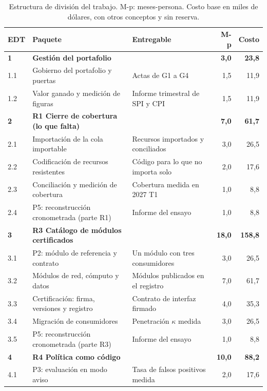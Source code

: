 \documentclass[11pt,letterpaper]{article}
\begin{document}
\begin{table}[H]
\centering
\footnotesize
\setlength{\tabcolsep}{3.5pt}
\caption{Estructura de división del trabajo. M-p: meses-persona. Costo base en
miles de dólares, con otros conceptos y sin reserva.}
\label{tab:edt}
\begin{tabularx}{\textwidth}{@{}l>{\raggedright\arraybackslash}p{5.4cm}>{\raggedright\arraybackslash}Xrr@{}}
\toprule
\textbf{EDT} & \textbf{Paquete} & \textbf{Entregable} & \textbf{M-p} &
  \textbf{Costo} \\
\midrule
\textbf{1} & \textbf{Gestión del portafolio} & & \textbf{3,0} & \textbf{23,8} \\
1.1 & Gobierno del portafolio y puertas & Actas de G1 a G4 & 1,5 & 11,9 \\
1.2 & Valor ganado y medición de figuras & Informe trimestral de SPI y CPI & 1,5 & 11,9 \\
\addlinespace[2pt]
\textbf{2} & \textbf{R1 Cierre de cobertura (lo que falta)} & & \textbf{7,0} & \textbf{61,7} \\
2.1 & Importación de la cola importable & Recursos importados y conciliados & 3,0 & 26,5 \\
2.2 & Codificación de recursos resistentes & Código para lo que no importa solo & 2,0 & 17,6 \\
2.3 & Conciliación y medición de cobertura & Cobertura medida en 2027 T1 & 1,0 & 8,8 \\
2.4 & P5: reconstrucción cronometrada (parte R1) & Informe del ensayo & 1,0 & 8,8 \\
\addlinespace[2pt]
\textbf{3} & \textbf{R3 Catálogo de módulos certificados} & & \textbf{18,0} & \textbf{158,8} \\
3.1 & P2: módulo de referencia y contrato & Un módulo con tres consumidores & 3,0 & 26,5 \\
3.2 & Módulos de red, cómputo y datos & Módulos publicados en el registro & 7,0 & 61,7 \\
3.3 & Certificación: firma, versiones y registro & Contrato de interfaz firmado & 4,0 & 35,3 \\
3.4 & Migración de consumidores & Penetración $\kappa$ medida & 3,0 & 26,5 \\
3.5 & P5: reconstrucción cronometrada (parte R3) & Informe del ensayo & 1,0 & 8,8 \\
\addlinespace[2pt]
\textbf{4} & \textbf{R4 Política como código} & & \textbf{10,0} & \textbf{88,2} \\
4.1 & P3: evaluación en modo aviso & Tasa de falsos positivos medida & 2,0 & 17,6 \\

\end{tabularx}
\end{table}
\end{document}
